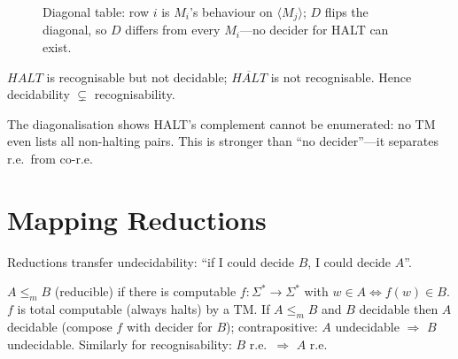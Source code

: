 \begin{figure}[h]
\centering
{}
\caption{Diagonal table: row $i$ is $M_i$'s behaviour on $\langle M_j\rangle$; $D$ flips the diagonal, so $D$ differs from every $M_i$---no decider for HALT can exist.}
\label{fig:diagonal}
\end{figure}

\begin{corollary}
$HALT$ is recognisable but not decidable; $\overline{HALT}$ is not recognisable. Hence decidability $\subsetneq$ recognisability.
\end{corollary}
The diagonalisation shows HALT's complement cannot be enumerated: no TM even lists all non-halting pairs. This is stronger than ``no decider''---it separates r.e.\ from co-r.e.

\section{Mapping Reductions}
\label{sec:reductions}
Reductions transfer undecidability: ``if I could decide $B$, I could decide $A$''.

\begin{definition}
$A\le_m B$ (reducible) if there is computable $f:\Sigma^*\to\Sigma^*$ with $w\in A\iff f(w)\in B$. $f$ is total computable (always halts) by a TM. If $A\le_m B$ and $B$ decidable then $A$ decidable (compose $f$ with decider for $B$); contrapositive: $A$ undecidable $\Rightarrow$ $B$ undecidable. Similarly for recognisability: $B$ r.e.\ $\Rightarrow$ $A$ r.e.
\end{definition}

